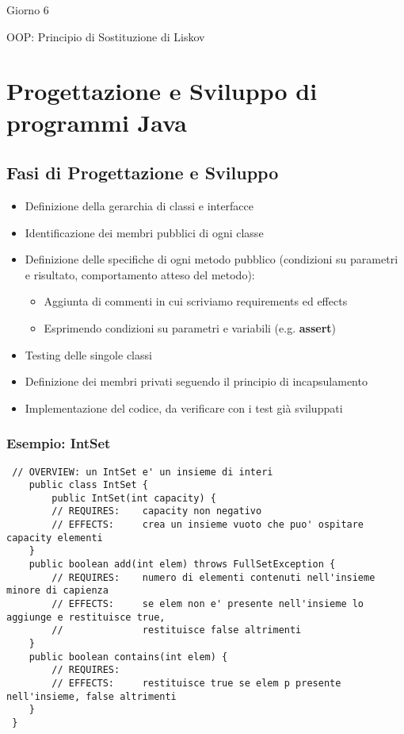 \documentclass[a4paper,10pt]{article}
\begin{document}
\begin{center}
    \LARGE Giorno 6\smallskip

    \Large OOP: Principio di Sostituzione di Liskov
\end{center}\smallskip

\begin{abstract}

\end{abstract}

\section{Progettazione e Sviluppo di programmi Java}
\subsection{Fasi di Progettazione e Sviluppo}
\begin{itemize}
 \item Definizione della gerarchia di classi e interfacce
 \item Identificazione dei membri pubblici di ogni classe
 \item Definizione delle specifiche di ogni metodo pubblico (condizioni su parametri e risultato, comportamento atteso del metodo):
 \begin{itemize}
  \item Aggiunta di commenti in cui scriviamo requirements ed effects
  \item Esprimendo condizioni su parametri e variabili (e.g. \textbf{assert})
 \end{itemize}

 \item Testing delle singole classi
 \item Definizione dei membri privati seguendo il principio di incapsulamento
 \item Implementazione del codice, da verificare con i test già sviluppati
\end{itemize}
\subsubsection{Esempio: IntSet}
\begin{lstlisting}
 // OVERVIEW: un IntSet e' un insieme di interi
    public class IntSet {
        public IntSet(int capacity) {
        // REQUIRES:    capacity non negativo
        // EFFECTS:     crea un insieme vuoto che puo' ospitare capacity elementi
    }
    public boolean add(int elem) throws FullSetException {
        // REQUIRES:    numero di elementi contenuti nell'insieme minore di capienza
        // EFFECTS:     se elem non e' presente nell'insieme lo aggiunge e restituisce true,
        //              restituisce false altrimenti
    }
    public boolean contains(int elem) {
        // REQUIRES:
        // EFFECTS:     restituisce true se elem p presente nell'insieme, false altrimenti
    }
 }
\end{lstlisting}
\end{document}
